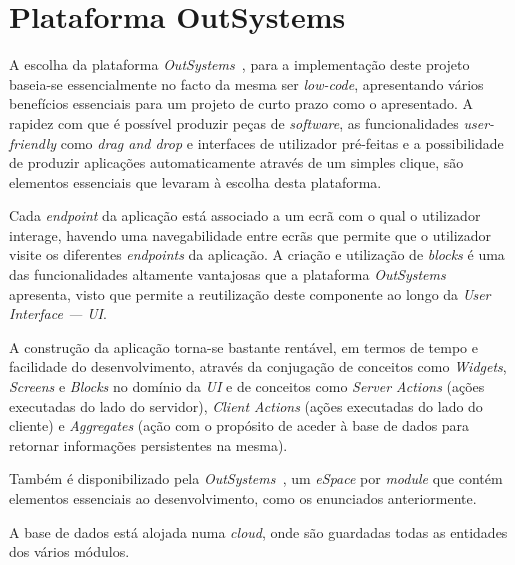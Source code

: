 \newpage

\section{Plataforma OutSystems}\label{sec:plataformaOutSystems}

A escolha da plataforma \textit{OutSystems~\cite{outsystems}}, para a implementação deste projeto baseia-se essencialmente no facto da mesma ser \textit{low-code},
apresentando vários benefícios essenciais para um projeto de curto prazo como o apresentado. A rapidez
com que é possível produzir peças de \textit{software}, as funcionalidades \textit{user-friendly} como \textit{drag and drop} e 
interfaces de utilizador pré-feitas e a possibilidade de produzir aplicações automaticamente através de
um simples clique, são elementos essenciais que levaram à escolha desta plataforma. 
\par
Cada \textit{endpoint} da aplicação está associado a um ecrã com o qual o utilizador interage, havendo uma navegabilidade entre ecrãs que permite que o utilizador visite os diferentes \textit{endpoints} da aplicação.
A criação e utilização de \textit{blocks} é uma das funcionalidades altamente vantajosas que a plataforma \textit{OutSystems~\cite{outsystems}} apresenta, 
visto que permite a reutilização deste componente ao longo da \textit{User Interface --- UI}.
\par
A construção da aplicação torna-se bastante rentável, em termos de tempo e facilidade do desenvolvimento, 
através da conjugação de conceitos como \textit{Widgets}, \textit{Screens} e \textit{Blocks} no domínio da  \textit{UI} 
e de conceitos como \textit{Server Actions} (ações executadas do lado do servidor), \textit{Client Actions} (ações executadas do lado do cliente) 
e \textit{Aggregates} (ação com o propósito de aceder à base de dados para retornar informações persistentes na mesma).
\par
Também é disponibilizado pela \textit{OutSystems~\cite{outsystems}}, um \textit{eSpace} por \textit{module} que contém elementos essenciais 
ao desenvolvimento, como os enunciados anteriormente.
\par
A base de dados está alojada numa \textit{cloud}, onde são guardadas todas as entidades dos vários módulos.
